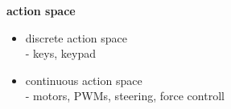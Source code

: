 \documentclass[xcolor=dvipsnames]{beamer}
\begin{document}
\begin{frame}{\bf action space}

  \begin{itemize}
    \item discrete action space \\
      - keys, keypad
    \item continuous action space \\
      - motors, PWMs, steering, force controll
  \end{itemize}


\end{frame}
\end{document}
